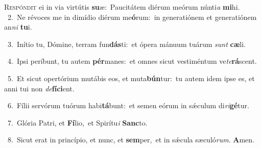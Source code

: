 \lettrine{\initial\textcolor{\initialcolor}{R}}{espóndit} ei in via virtútis \textbf{su}\-æ:~\star Paucitátem diérum meórum núnti\textit{a} \textbf{mi}\-hi.\\
{\numbfont\textcolor{\numbcolor}{~2.}}~Ne révoces me in dimídio diérum me\-\textbf{ó}\-rum:~\star in generatiónem et generatiónem an\textit{ni} \textbf{tu}\-i.\par
{\numbfont\textcolor{\numbcolor}{~3.}}~Inítio tu, Dómine, terram fun\-\textbf{dás}\-ti:~\star et ópera mánuum tuárum \textit{sunt} \textbf{cæ}\-li.\par
{\numbfont\textcolor{\numbcolor}{~4.}}~Ipsi períbunt, tu autem \textbf{pér}\-manes:~\star et omnes sicut vestiméntum ve\-\textit{te}\-\textbf{rá}scent.\par
{\numbfont\textcolor{\numbcolor}{~5.}}~Et sicut opertórium mutábis eos, et muta\-\textbf{bún}\-tur:~\star tu autem idem ipse es, et anni tui non \textit{de}\-\textbf{fí}\textbf{ci}ent.\par
{\numbfont\textcolor{\numbcolor}{~6.}}~Fílii servórum tuórum habi\-\textbf{tá}\-bunt:~\star et semen eórum in sǽculum di\-\textit{ri}\-\textbf{gé}tur.\par
{\numbfont\textcolor{\numbcolor}{~7.}}~Glória Patri, et \textbf{Fí}\-lio,~\star et Spirítu\textit{i} \textbf{Sanc}\-to.\par
{\numbfont\textcolor{\numbcolor}{~8.}}~Sicut erat in princípio, et nunc, et \textbf{sem}\-per,~\star et in sǽcula sæculó\-\textit{rum}\-. \textbf{A}\-men.\par
